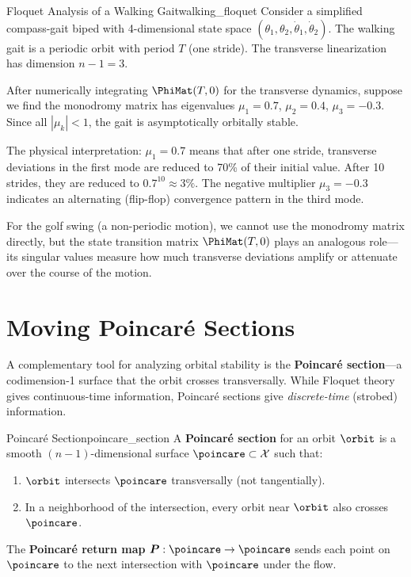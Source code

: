 \documentclass[12pt, openany]{book}
\theoremstyle{plain}
\newcommand{\statespace}{\mathcal{X}}
\begin{document}
\begin{example}{Floquet Analysis of a Walking Gait}{walking_floquet}
  Consider a simplified compass-gait biped with 4-dimensional state space
  $(\theta_1, \theta_2, \dot{\theta}_1, \dot{\theta}_2)$. The walking gait
  is a periodic orbit with period $T$ (one stride). The transverse
  linearization has dimension $n - 1 = 3$.

  After numerically integrating $\PhiMat(T, 0)$ for the transverse dynamics,
  suppose we find the monodromy matrix has eigenvalues
  $\mu_1 = 0.7$, $\mu_2 = 0.4$, $\mu_3 = -0.3$.
  Since all $|\mu_k| < 1$, the gait is asymptotically orbitally stable.

  The physical interpretation: $\mu_1 = 0.7$ means that after one stride,
  transverse deviations in the first mode are reduced to 70\% of their
  initial value. After 10 strides, they are reduced to $0.7^{10} \approx 3\%$.
  The negative multiplier $\mu_3 = -0.3$ indicates an alternating (flip-flop)
  convergence pattern in the third mode.

  For the golf swing (a non-periodic motion), we cannot use the monodromy
  matrix directly, but the state transition matrix $\PhiMat(T, 0)$ plays an
  analogous role---its singular values measure how much transverse
  deviations amplify or attenuate over the course of the motion.
\end{example}

\section{Moving Poincar\'e Sections}

A complementary tool for analyzing orbital stability is the
\textbf{Poincar\'e section}---a codimension-1 surface that the orbit
crosses transversally. While Floquet theory gives continuous-time
information, Poincar\'e sections give \emph{discrete-time} (strobed)
information.

\begin{definition}{Poincar\'e Section}{poincare_section}
  A \textbf{Poincar\'e section} for an orbit $\orbit$ is a smooth
  $(n{-}1)$-dimensional surface $\poincare \subset \statespace$ such that:
  \begin{enumerate}[label=(\roman*)]
    \item $\orbit$ intersects $\poincare$ transversally (not tangentially).
    \item In a neighborhood of the intersection, every orbit near $\orbit$
      also crosses $\poincare$.
  \end{enumerate}
  The \textbf{Poincar\'e return map} $\bm{P}: \poincare \to \poincare$ sends
  each point on $\poincare$ to the next intersection with $\poincare$ under
  the flow.
\end{definition}
\end{document}

